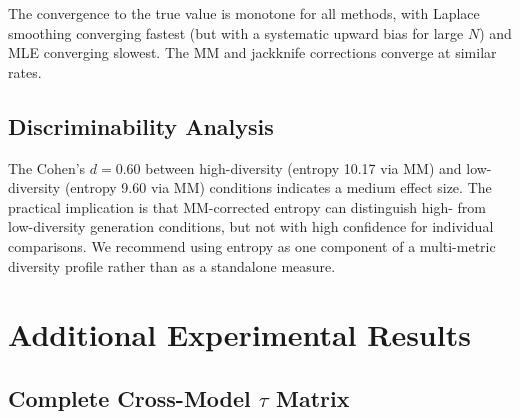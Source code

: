 \documentclass[11pt,a4paper]{article}
\begin{document}
The convergence to the true value is monotone for all
methods, with Laplace smoothing converging fastest
(but with a systematic upward bias for large $N$) and
MLE converging slowest.  The MM and jackknife corrections
converge at similar rates.

\subsection{Discriminability Analysis}

The Cohen's $d = 0.60$ between high-diversity (entropy 10.17
via MM) and low-diversity (entropy 9.60 via MM) conditions
indicates a medium effect size.  The practical implication
is that MM-corrected entropy can distinguish high- from
low-diversity generation conditions, but not with high
confidence for individual comparisons.  We recommend
using entropy as one component of a multi-metric diversity
profile rather than as a standalone measure.

\section{Additional Experimental Results}\label{app:additional}

\subsection{Complete Cross-Model $\tau$ Matrix}
\end{document}

